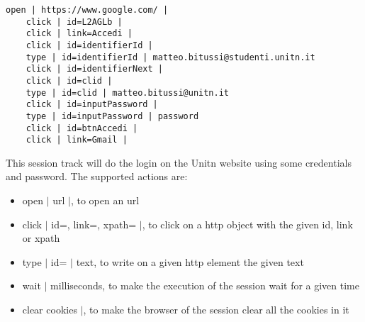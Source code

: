 \begin{lstlisting}[caption=Session track Unitn login]
    open | https://www.google.com/ |
    click | id=L2AGLb |
    click | link=Accedi |
    click | id=identifierId |
    type | id=identifierId | matteo.bitussi@studenti.unitn.it
    click | id=identifierNext |
    click | id=clid |
    type | id=clid | matteo.bitussi@unitn.it
    click | id=inputPassword |
    type | id=inputPassword | password
    click | id=btnAccedi |
    click | link=Gmail |
\end{lstlisting}

This \gls{session track} will do the login on the Unitn website using some credentials and password. The supported actions are:
\begin{itemize}
    \item open $|$ url $|$, to open an url
    \item click $|$ id=, link=, xpath= $|$, to click on a http object with the given id, link or xpath
    \item type $|$ id= $|$ text, to write on a given http element the given text
    \item wait $|$ milliseconds, to make the execution of the session wait for a given time 
    \item clear cookies $|$, to make the browser of the session clear all the cookies in it
\end{itemize}



